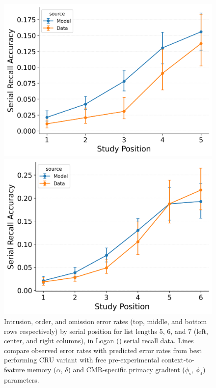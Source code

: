 \documentclass[
  man,
  floatsintext,
  longtable,
  nolmodern,
  notxfonts,
  notimes,
  draftfirst,
  colorlinks=true,linkcolor=blue,citecolor=blue,urlcolor=blue]{apa7}
\begin{document}
\begin{figure}

\caption{\label{fig-best-serial-errors}Intrusion, order, and omission
error rates (top, middle, and bottom rows respectively) by serial
position for list lengths 5, 6, and 7 (left, center, and right columns),
in Logan () serial recall data.
Lines compare observed error rates with predicted error rates from best
performing CRU variant with free pre-experimental context-to-feature
memory (\(\alpha\), \(\delta\)) and CMR-specific primacy gradient
(\(\phi_\text{s}\), \(\phi_\text{d}\)) parameters.}

\begin{minipage}{0.33\linewidth}
\includegraphics{figures/Gordon2021_CRU_with_Pre-Expt_and_Primacy__and_ContextTerm_Confusable_Fitting_intrusion_error_rate_LL5.png}\end{minipage}%
%
\begin{minipage}{0.33\linewidth}
\includegraphics{figures/Gordon2021_CRU_with_Pre-Expt_and_Primacy__and_ContextTerm_Confusable_Fitting_intrusion_error_rate_LL6.png}\end{minipage}%

\end{figure}
\end{document}
